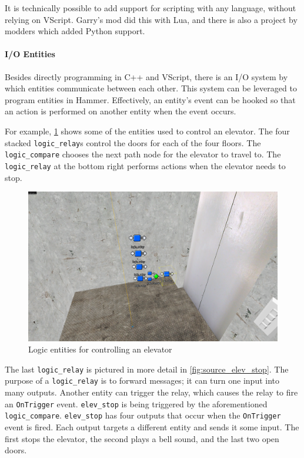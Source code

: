 \documentclass[a4paper, 12pt]{scrartcl}
\begin{document}
It is technically possible to add support for scripting with any language, without relying on VScript. Garry's mod did this with Lua, and there is also a project by modders which added Python support.

\paragraph{I/O Entities}
Besides directly programming in C++ and VScript, there is an I/O system by which entities communicate between each other. This system can be leveraged to program entities in Hammer. Effectively, an entity's event can be hooked so that an action is performed on another entity when the event occurs.

For example, \cref{fig:source_entities} shows some of the entities used to control an elevator. The four stacked \texttt{logic\_relay}s control the doors for each of the four floors. The \texttt{logic\_compare} chooses the next path node for the elevator to travel to. The \texttt{logic\_relay} at the bottom right performs actions when the elevator needs to stop.

\begin{figure}[!ht]
  \centering
  \includegraphics[width=0.75\linewidth]{images/source_io_entities.png}
  \caption{Logic entities for controlling an elevator}
  \label{fig:source_entities}
\end{figure}

The last \texttt{logic\_relay} is pictured in more detail in \cref{fig:source_elev_stop}. The purpose of a \texttt{logic\_relay} is to forward messages; it can turn one input into many outputs. Another entity can trigger the relay, which causes the relay to fire an \texttt{OnTrigger} event. \texttt{elev\_stop} is being triggered by the aforementioned \texttt{logic\_compare}. \texttt{elev\_stop} has four outputs that occur when the \texttt{OnTrigger} event is fired. Each output targets a different entity and sends it some input. The first stops the elevator, the second plays a bell sound, and the last two open doors.
\end{document}
